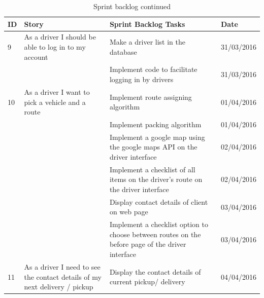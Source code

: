 \documentclass[paper=a4, fontsize=11pt]{scrartcl} %
\numberwithin{equation}{section} %
\numberwithin{figure}{section} %
\numberwithin{table}{section} %
\begin{document}
\begin{table}[!hbt]
\centering
\caption{Sprint backlog continued}
\label{SprintBacklogTableSecond}
\begin{tabular}{|p{1cm}|p{5cm}|p{5cm}|p{2cm}|}
\hline
\textbf{ID} & \textbf{Story}                                                             & \textbf{Sprint Backlog Tasks}                                                                    & \textbf{Date} \\ \hline
9           & As a driver I should be able to log in to my account                       & Make a driver list in the database                                                               & 31/03/2016    \\ \hline
            &                                                                            & Implement code to facilitate logging in by drivers                                               & 31/03/2016    \\ \hline
10          & As a driver I want to pick a vehicle and a route                           & Implement route assigning algorithm                                                              & 01/04/2016    \\ \hline
            &                                                                            & Implement packing algorithm                                                                      & 01/04/2016    \\ \hline
            &                                                                            & Implement a google map using the google maps API on the driver interface                         & 02/04/2016    \\ \hline
            &                                                                            & Implement a checklist of all items on  the driver's route on the driver interface                & 02/04/2016    \\ \hline
            &                                                                            & Display contact details of client on web page                                                    & 03/04/2016    \\ \hline
            &                                                                            & Implement a checklist option to choose between routes on the before page of the driver interface & 03/04/2016    \\ \hline
11          & As a driver I need to see the contact details of my next delivery / pickup & Display the contact details of current pickup/ delivery                                          & 04/04/2016    \\ \hline

\end{tabular}
\end{table}
\end{document}

